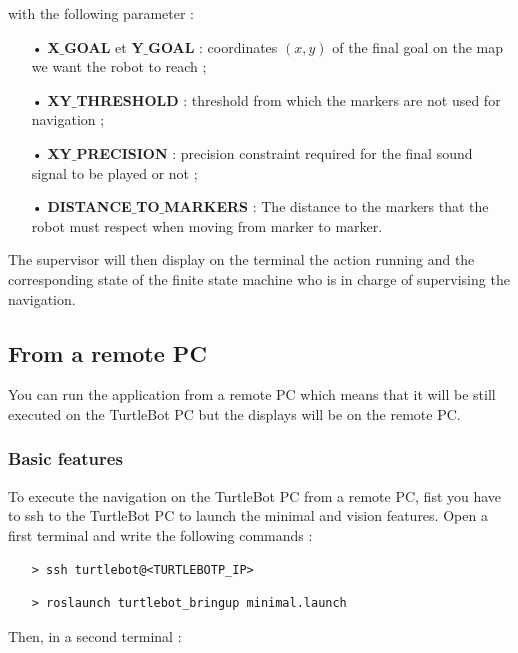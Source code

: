 \documentclass[10pt,a4paper]{article}
\begin{document}
\noindent with the following parameter : 

\begin{itemize}
\item[•] \textbf{X$\_$GOAL} et \textbf{Y$\_$GOAL} : coordinates $(x,y)$ of the final goal on the map we want the robot to reach ; 
\item[•] \textbf{XY$\_$THRESHOLD} : threshold from which the markers are not used for navigation ; 
\item[•] \textbf{XY$\_$PRECISION} : precision constraint required for the final sound signal to be played or not ; 
\item[•] \textbf{DISTANCE$\_$TO$\_$MARKERS} : The distance to the markers that the robot must respect when moving from marker to marker.
\end{itemize}

The supervisor will then display on the terminal the action running and the corresponding state of the finite state machine who is in charge of supervising the navigation.

\subsection{From a remote PC}

You can run the application from a remote PC which means that it will be still executed on the TurtleBot PC but the displays will be on the remote PC.

\subsubsection{Basic features}

To execute the navigation on the TurtleBot PC from a remote PC, fist you have to ssh to the TurtleBot PC to launch the minimal and vision features. Open a first terminal and write the following commands :

\begin{itemize}
\item[]  \begin{verbatim}> ssh turtlebot@<TURTLEBOTP_IP> \end{verbatim}
\item[]  \begin{verbatim}> roslaunch turtlebot_bringup minimal.launch \end{verbatim}
\end{itemize}

Then, in a second terminal :
\end{document}
